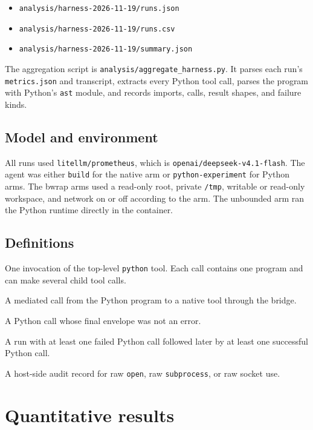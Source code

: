 \documentclass[11pt]{article}
\newcommand{\code}[1]{\texttt{#1}}
\begin{document}
\begin{itemize}[leftmargin=1.5em]
\item \code{analysis/harness-2026-11-19/runs.json}
\item \code{analysis/harness-2026-11-19/runs.csv}
\item \code{analysis/harness-2026-11-19/summary.json}
\end{itemize}

The aggregation script is \code{analysis/aggregate\_harness.py}.  It parses each
run's \code{metrics.json} and transcript, extracts every Python tool call, parses
the program with Python's \code{ast} module, and records imports, calls, result
shapes, and failure kinds.

\subsection{Model and environment}

All runs used \code{litellm/prometheus}, which is
\code{openai/deepseek-v4.1-flash}.  The agent was either \code{build} for the
native arm or \code{python-experiment} for Python arms.  The bwrap arms used a
read-only root, private \code{/tmp}, writable or read-only workspace, and
network on or off according to the arm.  The unbounded arm ran the Python
runtime directly in the container.

\subsection{Definitions}

\begin{description}[leftmargin=1.5em]
\item[Python call] One invocation of the top-level \code{python} tool.  Each
call contains one program and can make several child tool calls.
\item[Child call] A mediated call from the Python program to a native tool
through the bridge.
\item[Successful program] A Python call whose final envelope was not an error.
\item[Recovered run] A run with at least one failed Python call followed later
by at least one successful Python call.
\item[Audit event] A host-side audit record for raw \code{open}, raw
\code{subprocess}, or raw socket use.
\end{description}

\section{Quantitative results}
\end{document}
